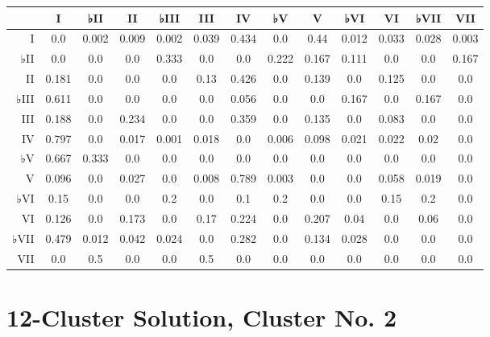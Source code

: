 \begin{table}[htbp]
\begin{minipage}{\linewidth}
\setlength{\tymax}{0.5\linewidth}
\centering
\small
\begin{tabulary}{\textwidth}{@{}RCCCCCCCCCCCC@{}} \toprule
&I&♭II&II&♭III&III&IV&♭V&V&♭VI&VI&♭VII&VII\\
\midrule
I&0.0&0.002&0.009&0.002&0.039&0.434&0.0&0.44&0.012&0.033&0.028&0.003\\
♭II&0.0&0.0&0.0&0.333&0.0&0.0&0.222&0.167&0.111&0.0&0.0&0.167\\
II&0.181&0.0&0.0&0.0&0.13&0.426&0.0&0.139&0.0&0.125&0.0&0.0\\
♭III&0.611&0.0&0.0&0.0&0.0&0.056&0.0&0.0&0.167&0.0&0.167&0.0\\
III&0.188&0.0&0.234&0.0&0.0&0.359&0.0&0.135&0.0&0.083&0.0&0.0\\
IV&0.797&0.0&0.017&0.001&0.018&0.0&0.006&0.098&0.021&0.022&0.02&0.0\\
♭V&0.667&0.333&0.0&0.0&0.0&0.0&0.0&0.0&0.0&0.0&0.0&0.0\\
V&0.096&0.0&0.027&0.0&0.008&0.789&0.003&0.0&0.0&0.058&0.019&0.0\\
♭VI&0.15&0.0&0.0&0.2&0.0&0.1&0.2&0.0&0.0&0.15&0.2&0.0\\
VI&0.126&0.0&0.173&0.0&0.17&0.224&0.0&0.207&0.04&0.0&0.06&0.0\\
♭VII&0.479&0.012&0.042&0.024&0.0&0.282&0.0&0.134&0.028&0.0&0.0&0.0\\
VII&0.0&0.5&0.0&0.0&0.5&0.0&0.0&0.0&0.0&0.0&0.0&0.0\\

\bottomrule

\end{tabulary}
\end{minipage}
\end{table}

\section{12-Cluster Solution, Cluster No. 2}
\label{12-clustersolutionclusterno.2}

